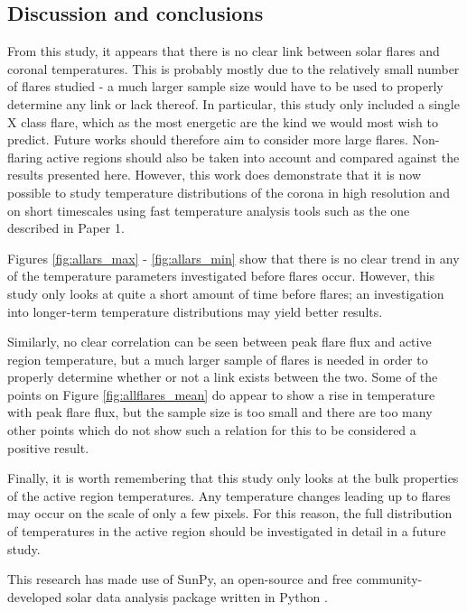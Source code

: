 \documentclass[referee,a4paper,12pt]{swsc}
\begin{document}
\begin{linenumbers}
\section{Discussion and conclusions}
From this study, it appears that there is no clear link between solar flares and coronal temperatures.
This is probably mostly due to the relatively small number of flares studied - a much larger sample size would have to be used to properly determine any link or lack thereof.
In particular, this study only included a single X class flare, which as the most energetic are the kind we would most wish to predict.
Future works should therefore aim to consider more large flares.
Non-flaring active regions should also be taken into account and compared against the results presented here.
However, this work does demonstrate that it is now possible to study temperature distributions of the corona in high resolution and on short timescales using fast temperature analysis tools such as the one described in Paper 1.

Figures \ref{fig:allars_max} - \ref{fig:allars_min} show that there is no clear trend in any of the temperature parameters investigated before flares occur.
However, this study only looks at quite a short amount of time before flares; an investigation into longer-term temperature distributions may yield better results.

Similarly, no clear correlation can be seen between peak flare flux and active region temperature, but a much larger sample of flares is needed in order to properly determine whether or not a link exists between the two.
Some of the points on Figure \ref{fig:allflares_mean} do appear to show a rise in temperature with peak flare flux, but the sample size is too small and there are too many other points which do not show such a relation for this to be considered a positive result.

Finally, it is worth remembering that this study only looks at the bulk properties of the active region temperatures.
Any temperature changes leading up to flares may occur on the scale of only a few pixels.
For this reason, the full distribution of temperatures in the active region should be investigated in detail in a future study.

\begin{acknowledgements}
	This research has made use of SunPy, an open-source and free community-developed solar data analysis package written in Python \citep{Mumford2013}.
\end{acknowledgements}




\end{linenumbers}
\end{document}
